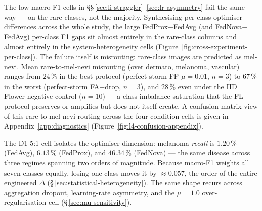 \documentclass[11pt,a4paper]{report}
\begin{document}
The low-macro-F1 cells in \S\S\,\ref{sec:li-straggler}--\ref{sec:lr-asymmetry}
fail the same way --- on the rare classes, not the majority. Synthesising
per-class optimiser differences across the whole study, the large
FedProx$-$FedAvg (and FedNova$-$FedAvg) per-class F1 gaps sit almost entirely in
the rare-class columns and almost entirely in the system-heterogeneity cells
(Figure~\ref{fig:cross-experiment-per-class}). The failure itself is misrouting:
rare-class images are predicted as mel-nevi. Mean rare-to-mel-nevi
misrouting (over dermato, melanoma, vascular) ranges from $24\,\%$ in the
best protocol (perfect-storm FP $\mu = 0.01$, $n=3$) to $67\,\%$ in the
worst (perfect-storm FA+drop, $n=3$), and $28\,\%$ even under the IID
Flower negative control ($n=10$) --- a class-imbalance saturation that the
FL protocol preserves or amplifies but does not itself create. A confusion-matrix
view of this rare-to-mel-nevi routing across the four-condition cells is given in
Appendix~\ref{app:diagnostics} (Figure~\ref{fig:l4-confusion-appendix}).

The D1 5:1 cell isolates the optimiser dimension: melanoma \emph{recall} is
$1.20\,\%$ (FedAvg), $6.13\,\%$ (FedProx), and $46.34\,\%$ (FedNova) --- the same
disease across three regimes spanning two orders of magnitude. Because macro-F1
weights all seven classes equally, losing one class moves it by $\approx 0.057$,
the order of the entire engineered $\Delta$ (\S\,\ref{sec:statistical-heterogeneity}).
The same shape recurs across aggregation dropout, learning-rate asymmetry, and the
$\mu = 1.0$ over-regularisation cell (\S\,\ref{sec:mu-sensitivity}).

\begin{table}[H]
\centering
\small
\caption{Rare-class collapse across four representative cells spanning the
straggler and learning-rate-asymmetry axes ($n=3$ each). Columns: Rare-F1
(mean F1 over dermato, melanoma, vascular), melanoma recall, melanoma F1, and
rare-to-mel-nevi misrouting. Mel.\ recall reports whether melanoma is recovered
at all; mel.\ F1 adds the precision penalty.}
\label{tab:collapse-cells}
\end{table}
\end{document}
